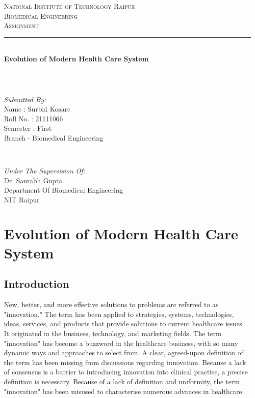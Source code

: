 \documentclass[12pt]{article}
\begin{document}
\begin{titlepage}
\newcommand{\HRule}{\rule{\linewidth}{0.5mm}}
\center
\textsc{\LARGE National Institute of Technology Raipur}\\[1.0cm]


\textsc{\Large Biomedical Engineering}\\[0.5cm] 
\textsc{\large Assignment}\\[0.5cm]
\HRule\\[0.4cm]
	
	{\huge\bfseries Evolution of Modern Health Care System}\\[0.1cm]
	\HRule\\[1.1cm]
	\begin{minipage}{0.4\textwidth}
		\begin{flushleft}
			\large
				
		\textit{Submitted By:}\\
          		Name : Surbhi Kosare \\
			   Roll No. : 21111066\\
			   Semester : First\\
			   Branch - Biomedical Engineering 
			   
			\end{flushleft}
	\end{minipage}
	~
	\begin{minipage}{0.5\textwidth}
		\begin{flushright}
			\large
			\textit{Under The Supervision Of:}\\
			Dr. Saurabh Gupta\\
			Department Of Biomedical Engineering\\
			NIT Raipur
		\end{flushright}
	\end{minipage}
	\vfill\vfill\vfill 
	
	
	\vfill 
\end{titlepage}

\section{Evolution of Modern Health Care System }

\subsection{Introduction}


New, better, and more effective solutions to problems are referred to as "innovation." The term has been applied to strategies, systems, technologies, ideas, services, and products that provide solutions to current healthcare issues. It originated in the business, technology, and marketing fields. The term "innovation" has become a buzzword in the healthcare business, with so many dynamic ways and approaches to select from. A clear, agreed-upon definition of the term has been missing from discussions regarding innovation. Because a lack of consensus is a barrier to introducing innovation into clinical practise, a precise definition is necessary. Because of a lack of definition and uniformity, the term "innovation" has been misused to characterise numerous advances in healthcare.
\end{document}
